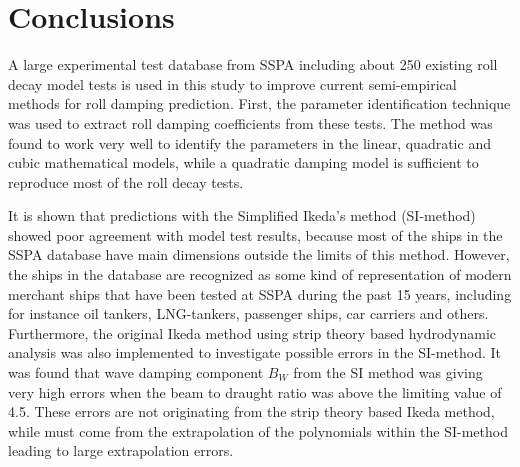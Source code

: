 \section{Conclusions}
\label{se:conclusions}
A large experimental test database from SSPA including about 250 existing roll decay model tests is used in this study to improve current semi-empirical methods for roll damping prediction. First, the parameter identification technique was used to extract roll damping coefficients from these tests. The method was found to work very well to identify the parameters in the linear, quadratic and cubic mathematical models, while a quadratic damping model is sufficient to reproduce most of the roll decay tests.

It is shown that predictions with the Simplified Ikeda's method (SI-method) showed poor agreement with model test results, because most of the ships in the SSPA database have main dimensions outside the limits of this method. However, the ships in the database are recognized as some kind of representation of modern merchant ships that have been tested at SSPA during the past 15 years, including for instance oil tankers, LNG-tankers, passenger ships, car carriers and others. 
Furthermore, the original Ikeda method using strip theory based hydrodynamic analysis was also implemented to investigate possible errors in the SI-method. 
It was found that wave damping component $B_W$ from the SI method was giving very high errors when the beam to draught ratio was above the limiting value of 4.5. These errors are not originating from the strip theory based Ikeda method, while must come from the extrapolation of the polynomials within the SI-method leading to large extrapolation errors. 

